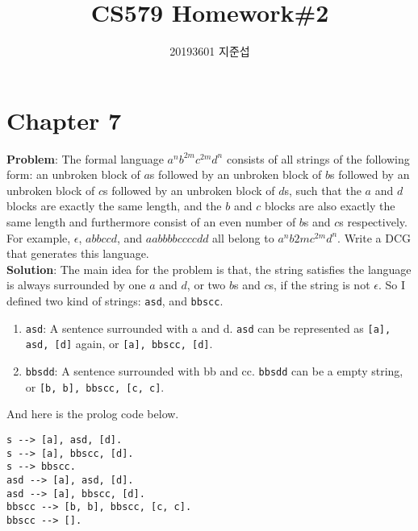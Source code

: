 \documentclass{article}
\author{20193601 지준섭}
\title{CS579 Homework\#2}
\begin{document}
\maketitle

\section{Chapter 7}
\textbf{Problem}: The formal language
$ a^{n}b^{2m}c^{2m}d^{n} $ consists of all strings of the following form:
an unbroken block of $a$s followed by an unbroken block of $b$s followed by
an unbroken block of $c$s followed by an unbroken block of $d$s,
such that the $a$ and $d$ blocks are exactly the same length,
and the $b$ and $c$ blocks are also exactly the same length
and furthermore consist of an even number of $b$s and $c$s respectively.
For example, $\epsilon$, $abbccd$, and $aabbbbccccdd$ all belong to $a^{n}b{2m}c^{2m}d^{n}$.
Write a DCG that generates this language. \\

\noindent
\textbf{Solution}:
The main idea for the problem is that,
the string satisfies the language is always surrounded by one $a$ and $d$,
or two $b$s and $c$s, if the string is not $\epsilon$.
So I defined two kind of strings: \texttt{asd}, and \texttt{bbscc}.
\begin{enumerate}
  \item \texttt{asd}: A sentence surrounded with a and d.
  \texttt{asd} can be represented as
  \texttt{[a], asd, [d]} again, or \texttt{[a], bbscc, [d]}.

  \item \texttt{bbsdd}: A sentence surrounded with bb and cc.
  \texttt{bbsdd} can be a empty string,
  or \texttt{[b, b], bbscc, [c, c]}.
\end{enumerate}
And here is the prolog code below.

\begin{verbatim}
s --> [a], asd, [d].
s --> [a], bbscc, [d].
s --> bbscc.
asd --> [a], asd, [d].
asd --> [a], bbscc, [d].
bbscc --> [b, b], bbscc, [c, c].
bbscc --> [].
\end{verbatim}
\end{document}
